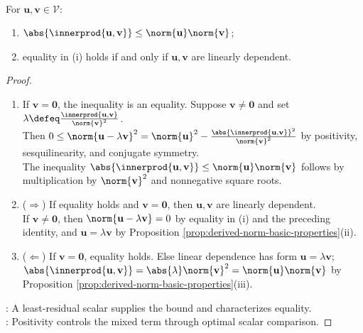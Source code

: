 \begin{theorem} \label{thm:cauchy-schwarz-inequality} \\
For $\mathbf{u},\mathbf{v}\in\mathcal{V}$:
\begin{enumerate}[label=(\roman*)]
\setlength{\itemsep}{0pt}
\item $\abs{\innerprod{\mathbf{u},\mathbf{v}}}\leq\norm{\mathbf{u}}\norm{\mathbf{v}}$;
\item equality in (i) holds if and only if $\mathbf{u},\mathbf{v}$ are linearly dependent.
\end{enumerate}
\begin{proof}
\begin{enumerate}[label=(\roman*)]
\setlength{\itemsep}{0pt}
\item[$(i)$] If $\mathbf{v}=\mathbf{0}$, the inequality is an equality. Suppose $\mathbf{v}\neq\mathbf{0}$ and set $\lambda\defeq\frac{\innerprod{\mathbf{u},\mathbf{v}}}{\norm{\mathbf{v}}^2}$.\\
Then $0\leq\norm{\mathbf{u}-\lambda\mathbf{v}}^2=\norm{\mathbf{u}}^2-\frac{\abs{\innerprod{\mathbf{u},\mathbf{v}}}^2}{\norm{\mathbf{v}}^2}$ by positivity, sesquilinearity, and conjugate symmetry.\\
The inequality $\abs{\innerprod{\mathbf{u},\mathbf{v}}}\leq\norm{\mathbf{u}}\norm{\mathbf{v}}$ follows by multiplication by $\norm{\mathbf{v}}^2$ and nonnegative square roots.
\item[$(ii)$] ($\Rightarrow$) If equality holds and $\mathbf{v}=\mathbf{0}$, then $\mathbf{u},\mathbf{v}$ are linearly dependent.\\
If $\mathbf{v}\neq\mathbf{0}$, then $\norm{\mathbf{u}-\lambda\mathbf{v}}=0$ by equality in (i) and the preceding identity, and $\mathbf{u}=\lambda\mathbf{v}$ by Proposition \ref{prop:derived-norm-basic-properties}(ii).
\item[$(ii)$] ($\Leftarrow$) If $\mathbf{v}=\mathbf{0}$, equality holds. Else linear dependence has form $\mathbf{u}=\lambda\mathbf{v}$; $\abs{\innerprod{\mathbf{u},\mathbf{v}}}=\abs{\lambda}\norm{\mathbf{v}}^2=\norm{\mathbf{u}}\norm{\mathbf{v}}$ by Proposition \ref{prop:derived-norm-basic-properties}(iii).
\end{enumerate}
: A least-residual scalar supplies the bound and characterizes equality.\\
: Positivity controls the mixed term through optimal scalar comparison.
\end{proof}
\end{theorem}

